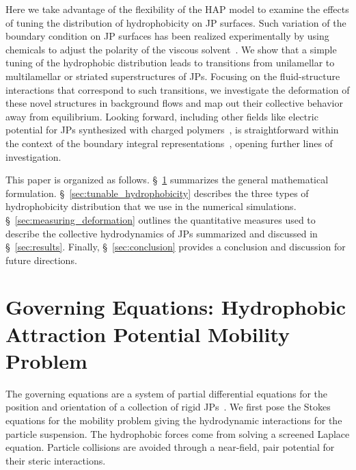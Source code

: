 \documentclass[prb,preprint,showpacs,preprintnumbers,amsmath,amssymb,longbibliography]{revtex4-2}
\begin{document}

Here we take advantage of the flexibility of the HAP model to examine
the effects of tuning the distribution of hydrophobicity on JP surfaces.
Such variation of the boundary condition on JP surfaces has been
realized experimentally by using chemicals to adjust the polarity of the
viscous solvent~\cite{Zarzaretal2015, KirillovaMarschelkeSynytska2019,
doi:10.1021/la503455h}. We show that a simple tuning of the hydrophobic
distribution leads to transitions from unilamellar to multilamellar or
striated superstructures of JPs. Focusing on the fluid-structure
interactions that correspond to such transitions, we investigate the
deformation of these novel structures in background flows and map out
their collective behavior away from equilibrium. Looking forward,
including other fields like electric potential for JPs synthesized with
charged polymers~\cite{HongCacciutoLuijtenGranick2008,
doi:10.1021/la503455h, KangHonciuc2018}, is straightforward within the
context of the boundary integral
representations~\cite{kohl-cor-che-vee22}, opening further lines of
investigation.

This paper is organized as follows. \S~\ref{sec:governing_equations}
summarizes the general mathematical formulation.
\S~\ref{sec:tunable_hydrophobicity} describes the three types of
hydrophobicity distribution that we use in the numerical simulations.
\S~\ref{sec:measuring_deformation} outlines the quantitative measures
used to describe the collective hydrodynamics of JPs summarized and
discussed in \S~\ref{sec:results}. Finally, \S~\ref{sec:conclusion}
provides a conclusion and discussion for future directions.

\section{Governing Equations: Hydrophobic Attraction Potential Mobility Problem} 
\label{sec:governing_equations}
The governing equations are a system of partial differential equations for the position and orientation of
a collection of rigid JPs~\cite{Fu2022_JFM}. We first pose the Stokes
equations for the mobility problem giving the hydrodynamic interactions
for the particle suspension. The hydrophobic forces come from solving a
screened Laplace equation. Particle collisions are avoided through a
near-field, pair potential for their steric interactions.
\end{document}
